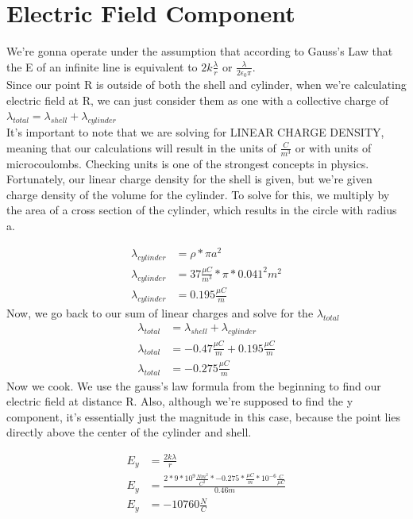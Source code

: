 \documentclass{article}
\begin{document}
\section{Electric Field Component}
We're gonna operate under the assumption that according to Gauss's Law that the E of an infinite line is equivalent to $2k\frac{\lambda}{r}$ or $\frac{\lambda}{2\epsilon_{0}\pi}$. \\
Since our point R is outside of both the shell and cylinder, when we're calculating electric field at R, we can just consider them as one with a collective charge of $\lambda_{total} = \lambda_{shell} + \lambda_{cylinder}$\\
It's important to note that we are solving for LINEAR CHARGE DENSITY, meaning that our calculations will result in the units of $\frac{C}{m^3}$ or with units of microcoulombs. Checking units is one of the strongest concepts in physics.  \\
Fortunately, our linear charge density for the shell is given, but we're given charge density of the volume for the cylinder. To solve for this, we multiply by the area of a cross section of the cylinder, which results in the circle with radius a. 

\begin{align*}
	\lambda_{cylinder} &= \rho * \pi a^2\\
	\lambda_{cylinder} &= 37 \frac{\mu C}{m^3} * \pi * 0.041^2 m^2\\
\lambda_{cylinder} &=  0.195\frac{\mu C}{m}
\end{align*}
Now, we go back to our sum of linear charges and solve for the $\lambda_{total}$
\begin{align*}
	\lambda_{total} &= \lambda_{shell} + \lambda_{cylinder}\\
	\lambda_{total} &= -0.47 \frac{\mu C}{m} + 0.195 \frac{\mu C}{m}\\
	\lambda_{total} &= -0.275 \frac{\mu C}{m}
\end{align*}
Now we cook. We use the gauss's law formula from the beginning to find our electric field at distance R. Also, although we're supposed to find the y component, it's essentially just the magnitude in this case, because the point lies directly above the center of the cylinder and shell.

\begin{align*}
	E_{y} &= \frac{2k\lambda}{r}\\
	E_{y} &= \frac{2 * 9 * 10^9 \frac{Nm^2}{C^2} * -0.275 * \frac{\mu C}{m} * 10^{-6} \frac{C}{\mu C}}{0.46m}\\
	E_{y} &= -10760\frac{N}{C}
\end{align*}
\end{document}

